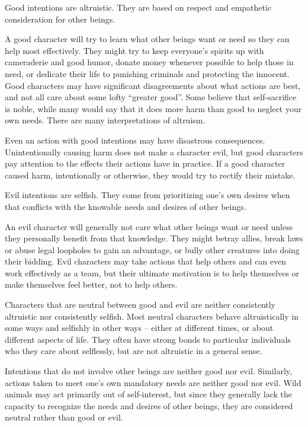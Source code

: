          Good intentions are altruistic.
        They are based on respect and empathetic consideration for other beings.

        A good character will try to learn what other beings want or need so they can help most effectively.
        They might try to keep everyone's spirits up with cameraderie and good humor, donate money whenever possible to help those in need, or dedicate their life to punishing criminals and protecting the innocent.
        Good characters may have significant disagreements about what actions are best, and not all care about some lofty ``greater good''.
        Some believe that self-sacrifice is noble, while many would say that it does more harm than good to neglect your own needs.
        There are many interpretations of altruism.

        Even an action with good intentions may have disastrous consequences.
        Unintentionally causing harm does not make a character evil, but good characters pay attention to the effects their actions have in practice.
        If a good character caused harm, intentionally or otherwise, they would try to rectify their mistake.

         Evil intentions are selfish.
        They come from prioritizing one's own desires when that conflicts with the knowable needs and desires of other beings.

        An evil character will generally not care what other beings want or need unless they personally benefit from that knowledge.
        They might betray allies, break laws or abuse legal loopholes to gain an advantage, or bully other creatures into doing their bidding.
        Evil characters may take actions that help others and can even work effectively as a team, but their ultimate motivation is to help themselves or make themselves feel better, not to help others.

         Characters that are neutral between good and evil are neither consistently altruistic nor consistently selfish.
        Most neutral characters behave altruistically in some ways and selfishly in other ways -- either at different times, or about different aspects of life.
        They often have strong bonds to particular individuals who they care about selflessly, but are not altruistic in a general sense.

        Intentions that do not involve other beings are neither good nor evil.
        Similarly, actions taken to meet one's own mandatory needs are neither good nor evil.
        Wild animals may act primarily out of self-interest, but since they generally lack the capacity to recognize the needs and desires of other beings, they are considered neutral rather than good or evil.

